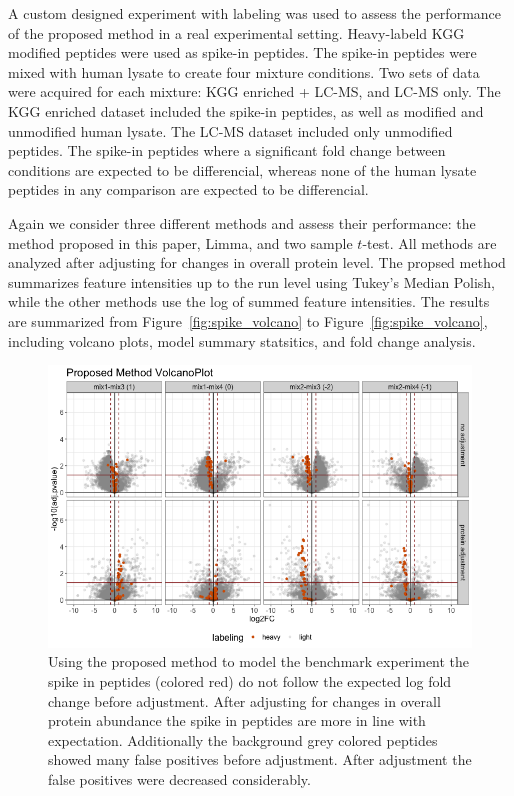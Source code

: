 \documentclass{mcp}
\def\sfigref#1{{Figure~\ref{#1}}}
\begin{document}
A custom designed experiment with labeling was used to assess the performance of the proposed method in a real experimental setting. Heavy-labeld KGG modified peptides were used as spike-in peptides. The spike-in peptides were mixed with human lysate to create four mixture conditions. Two sets of data were acquired for each mixture: KGG enriched + LC-MS, and LC-MS only. The KGG enriched dataset included the spike-in peptides, as well as modified and unmodified human lysate. The LC-MS dataset included only unmodified peptides. The spike-in peptides where a significant fold change between conditions are expected to be differencial, whereas none of the human lysate peptides in any comparison are expected to be differencial. 

Again we consider three different methods and assess their performance: the method proposed in this paper, Limma, and two sample $t$-test. All methods are analyzed after adjusting for changes in overall protein level. The propsed method summarizes feature intensities up to the run level using Tukey's Median Polish, while the other methods use the log of summed feature intensities. The results are summarized from \sfigref{fig:spike_volcano} to \sfigref{fig:spike_volcano}, including volcano plots, model summary statsitics, and fold change analysis.

\begin{figure}[h!]
\centering
\includegraphics[width=.85\textwidth]{sim_new/spike_in_msstatsptm_volcano}
\caption{Using the proposed method to model the benchmark experiment the spike in peptides (colored red) do not follow the expected log fold change before adjustment. After adjusting for changes in overall protein abundance the spike in peptides are more in line with expectation. Additionally the background grey colored peptides showed many false positives before adjustment. After adjustment the false positives were decreased considerably. \label{fig:spike_volcano_msstats}}
\end{figure}
\end{document}
